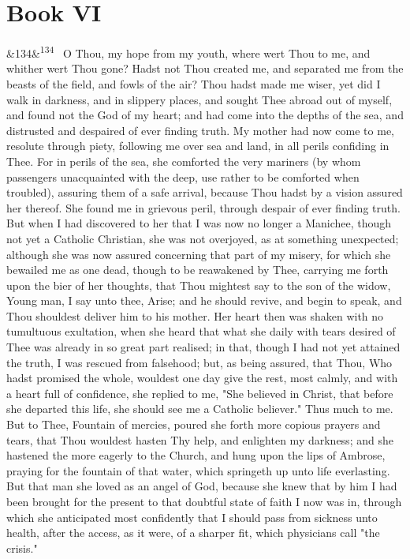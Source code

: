 \documentclass[12pt]{article}
\newcommand{\para}[1][]{\par\noindent\ifx&#1&\else\textsuperscript{\footnotesize #1}~\fi}
\begin{document}
\section*{Book VI}

\para[134] O Thou, my hope from my youth, where wert Thou to me, and whither wert Thou gone? Hadst not Thou created me, and separated me from the beasts of the field, and fowls of the air? Thou hadst made me wiser, yet did I walk in darkness, and in slippery places, and sought Thee abroad out of myself, and found not the God of my heart; and had come into the depths of the sea, and distrusted and despaired of ever finding truth. My mother had now come to me, resolute through piety, following me over sea and land, in all perils confiding in Thee. For in perils of the sea, she comforted the very mariners (by whom passengers unacquainted with the deep, use rather to be comforted when troubled), assuring them of a safe arrival, because Thou hadst by a vision assured her thereof. She found me in grievous peril, through despair of ever finding truth. But when I had discovered to her that I was now no longer a Manichee, though not yet a Catholic Christian, she was not overjoyed, as at something unexpected; although she was now assured concerning that part of my misery, for which she bewailed me as one dead, though to be reawakened by Thee, carrying me forth upon the bier of her thoughts, that Thou mightest say to the son of the widow, Young man, I say unto thee, Arise; and he should revive, and begin to speak, and Thou shouldest deliver him to his mother. Her heart then was shaken with no tumultuous exultation, when she heard that what she daily with tears desired of Thee was already in so great part realised; in that, though I had not yet attained the truth, I was rescued from falsehood; but, as being assured, that Thou, Who hadst promised the whole, wouldest one day give the rest, most calmly, and with a heart full of confidence, she replied to me, "She believed in Christ, that before she departed this life, she should see me a Catholic believer." Thus much to me. But to Thee, Fountain of mercies, poured she forth more copious prayers and tears, that Thou wouldest hasten Thy help, and enlighten my darkness; and she hastened the more eagerly to the Church, and hung upon the lips of Ambrose, praying for the fountain of that water, which springeth up unto life everlasting. But that man she loved as an angel of God, because she knew that by him I had been brought for the present to that doubtful state of faith I now was in, through which she anticipated most confidently that I should pass from sickness unto health, after the access, as it were, of a sharper fit, which physicians call "the crisis."
\end{document}
